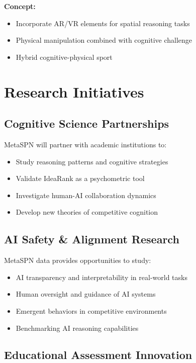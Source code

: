 \textbf{Concept:}
\begin{itemize}[leftmargin=*]
  \item Incorporate AR/VR elements for spatial reasoning tasks
  \item Physical manipulation combined with cognitive challenge
  \item Hybrid cognitive-physical sport
\end{itemize}

\section{Research Initiatives}

\subsection{Cognitive Science Partnerships}

MetaSPN will partner with academic institutions to:
\begin{itemize}[leftmargin=*]
  \item Study reasoning patterns and cognitive strategies
  \item Validate IdeaRank as a psychometric tool
  \item Investigate human-AI collaboration dynamics
  \item Develop new theories of competitive cognition
\end{itemize}

\subsection{AI Safety \& Alignment Research}

MetaSPN data provides opportunities to study:
\begin{itemize}[leftmargin=*]
  \item AI transparency and interpretability in real-world tasks
  \item Human oversight and guidance of AI systems
  \item Emergent behaviors in competitive environments
  \item Benchmarking AI reasoning capabilities
\end{itemize}

\subsection{Educational Assessment Innovation}

